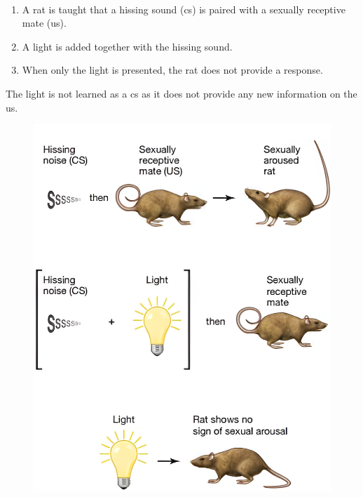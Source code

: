 \begin{example}
    \phantom{}\\
    \begin{minipage}{0.65\linewidth}
        \begin{enumerate}
            \item A rat is taught that a hissing sound (\ac{cs}) is paired with a sexually receptive mate (\ac{us}).
            \item A light is added together with the hissing sound.
            \item When only the light is presented, the rat does not provide a response.
        \end{enumerate}

        The light is not learned as a \ac{cs} as it does not provide any new information on the \ac{us}.
    \end{minipage}
    \begin{minipage}{0.3\linewidth}
        \begin{figure}[H]
            \centering
            \includegraphics[width=\linewidth]{./img/surprise_rats.png}
        \end{figure}
    \end{minipage}
\end{example}